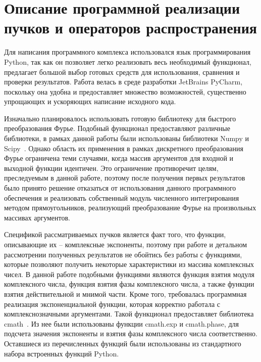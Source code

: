     \section[Описание программной реализации пучков и операторов распространения]{\nohyphens{Описание программной реализации пучков и операторов распространения}}
    {
    Для написания программного комплекса использовался язык
    программирования Python, так как он позволяет легко реализовать весь
    необходимый функционал, предлагает большой выбор готовых средств для
    использования, сравнения и проверки результатов. Работа велась в среде
    разработки JetBrains PyCharm, поскольку она удобна и предоставляет
    множество возможностей, существенно упрощающих и ускоряющих написание
    исходного кода.

    Изначально планировалось использовать готовую библиотеку для
    быстрого преобразования Фурье. Подобный функционал предоставляют
    различные библиотеки, в рамках данной работы были использованы
    библиотеки Numpy и Scipy~\cite{np}\hspace{-0.1cm}. Однако область их применения в рамках
    дискретного преобразования Фурье ограничена теми случаями, когда массив
    аргументов для входной и выходной функции идентичен.
    Это ограничение противоречит целям, преследуемым в данной работе, поэтому после получения
    первых результатов было принято решение отказаться от использования
    данного программного обеспечения и реализовать собственный модуль
    численного интегрирования методом прямоугольников, реализующий
    преобразование Фурье на произвольных массивах аргументов.

    Спецификой рассматриваемых пучков является факт того, что функции,
    описывающие их – комплексные экспоненты, поэтому при работе и детальном
    рассмотрении полученных результатов не обойтись без работы с функциями,
    которые позволяют получить некоторые характеристики из массива
    комплексных чисел. В данной работе подобными функциями являются
    функция взятия модуля комплексного числа, функция взятия фазы
    комплексного числа, а также функции взятия действительной и мнимой части.
    Кроме того, требовалась программная реализация экспоненциальной функции,
    которая корректно работала с комплекснозначными аргументами.
    Такой функционал предоставляет библиотека cmath~\cite{cmath}. Из нее были использованы
    функции cmath.exp и cmath.phase, для подсчета значения экспоненты и взятия
    фазы комплексного числа соответственно. Оставшиеся из перечисленных
    функций были использованы из стандартного набора встроенных функций
    Python.

}

